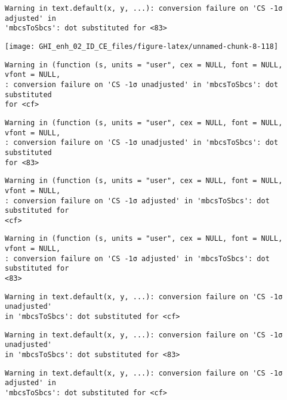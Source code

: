 \documentclass[
  10pt,
  a4paper,oneside]{article}
\begin{document}
\begin{verbatim}
Warning in text.default(x, y, ...): conversion failure on 'CS -1σ adjusted' in
'mbcsToSbcs': dot substituted for <83>
\end{verbatim}

\begin{center}\texttt{[image: GHI\_enh\_02\_ID\_CE\_files/figure-latex/unnamed-chunk-8-118]} \end{center}

\begin{verbatim}
Warning in (function (s, units = "user", cex = NULL, font = NULL, vfont = NULL,
: conversion failure on 'CS -1σ unadjusted' in 'mbcsToSbcs': dot substituted
for <cf>
\end{verbatim}

\begin{verbatim}
Warning in (function (s, units = "user", cex = NULL, font = NULL, vfont = NULL,
: conversion failure on 'CS -1σ unadjusted' in 'mbcsToSbcs': dot substituted
for <83>
\end{verbatim}

\begin{verbatim}
Warning in (function (s, units = "user", cex = NULL, font = NULL, vfont = NULL,
: conversion failure on 'CS -1σ adjusted' in 'mbcsToSbcs': dot substituted for
<cf>
\end{verbatim}

\begin{verbatim}
Warning in (function (s, units = "user", cex = NULL, font = NULL, vfont = NULL,
: conversion failure on 'CS -1σ adjusted' in 'mbcsToSbcs': dot substituted for
<83>
\end{verbatim}

\begin{verbatim}
Warning in text.default(x, y, ...): conversion failure on 'CS -1σ unadjusted'
in 'mbcsToSbcs': dot substituted for <cf>
\end{verbatim}

\begin{verbatim}
Warning in text.default(x, y, ...): conversion failure on 'CS -1σ unadjusted'
in 'mbcsToSbcs': dot substituted for <83>
\end{verbatim}

\begin{verbatim}
Warning in text.default(x, y, ...): conversion failure on 'CS -1σ adjusted' in
'mbcsToSbcs': dot substituted for <cf>
\end{verbatim}
\end{document}
